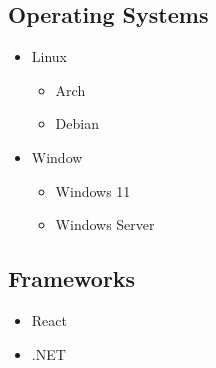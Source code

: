 \documentclass[a4paper,10pt]{article}
\let\olditem\item
\renewcommand{\item}{\olditem \fontsize{4.2mm}{5.2mm}\selectfont}
\begin{document}
\begin{minipage}[t][170mm]{0.33\textwidth}
    \subsection{Operating Systems}
    \begin{itemize}[noitemsep,topsep=0mm]
        \item Linux
        \begin{itemize}
         \item Arch
         \item Debian
        \end{itemize}
        \item Window
        \begin{itemize}
        \item Windows 11
         \item Windows Server
        \end{itemize}
    \end{itemize}
    \subsection{Frameworks}
    \begin{itemize}[noitemsep,topsep=0mm]
        \item React
        \item .NET
    \end{itemize}
    \vspace{3mm}
    
\end{minipage}
\hspace{0.01\textwidth}
\hfill
\end{document}
